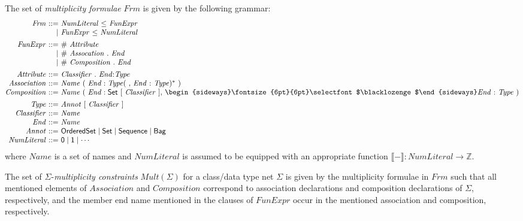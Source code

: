 \documentclass[10pt,fleqn,%
\ifpretendfinal
final%
\else
draft%
\fi,
]{scrreprt}
\newcommand{\composition}{\raisebox{0.2pt}{\begin{sideways}\fontsize{6pt}{6pt}\selectfont$\blacklozenge$\end{sideways}}}
\newcommand{\NZ}{\mathbb{Z}}
\newcommand{\sem}[1]{\mathopen\llbracket#1\mathclose\rrbracket}
\begin{document}
The set of \emph{multiplicity formulae} $\mathit{Frm}$ is given by
the following grammar:
%
\begin{equation*}
\begin{array}{@{}r@{\ }r@{\ }l@{}}
  \mathit{Frm} & ::= & \mathit{NumLiteral}\ \mathsf{\leq}\ \mathit{FunExpr}\\
               &   | & \mathit{FunExpr}\ \mathsf{\leq}\ \mathit{NumLiteral}
\\[1ex]
  \mathit{FunExpr} & ::= & \mathit{\#}\ \mathit{Attribute}\\
                   &   | & \mathit{\#}\ \mathit{Assocation}\ \mathsf{.}\ \mathit{End}\\
                   &   | & \mathit{\#}\ \mathit{Composition}\ \mathsf{.}\ \mathit{End}
\\[1ex]
  \mathit{Attribute} & ::= & \mathit{Classifier}\ \mathsf{.}\ \mathit{End} \mathsf{:} \mathit{Type}
\\
  \mathit{Association} & ::= & \mathit{Name}\ (\ \mathit{End} : \mathit{Type}(\ \mathsf{,}\ \mathit{End}\ \mathsf{:}\ \mathit{Type})^*\ )
\\
  \mathit{Composition} & ::= & \mathit{Name}\ (\ \mathit{End} : \mathsf{Set}\ [\ \mathit{Classifier}\ ]\mathsf{,}\ \composition \mathit{End}\ \mathsf{:}\ \mathit{Type}\ )
\\[1ex]
  \mathit{Type} & ::= & \mathit{Annot}\ \mathsf{[}\ \mathit{Classifier}\ \mathsf{]}
\\
  \mathit{Classifier} & ::= & \mathit{Name}
\\
  \mathit{End} & ::= & \mathit{Name}
\\
  \mathit{Annot} & ::= & \mathsf{OrderedSet} \mid \mathsf{Set} \mid \mathsf{Sequence} \mid \mathsf{Bag}
\\
  \mathit{NumLiteral} & ::= & \mathsf{0} \mid \mathsf{1} \mid \cdots
\end{array}
\end{equation*}
%
where $\mathit{Name}$ is a set of names and $\mathit{NumLiteral}$ is
assumed to be equipped with an appropriate function
$\sem{-} : \mathit{NumLiteral} \to \NZ$.

The set of $\Sigma$-\emph{multiplicity constraints}
$\mathit{Mult}(\Sigma)$ for a class/data type net $\Sigma$ is given by the
multiplicity formulae in $\mathit{Frm}$ such that all mentioned elements
of $\mathit{Association}$ and $\mathit{Composition}$ correspond to
association declarations and composition declarations of $\Sigma$,
respectively, and the member end name mentioned in the clauses of
$\mathit{FunExpr}$ occur in the mentioned association and composition,
respectively.
\end{document}
